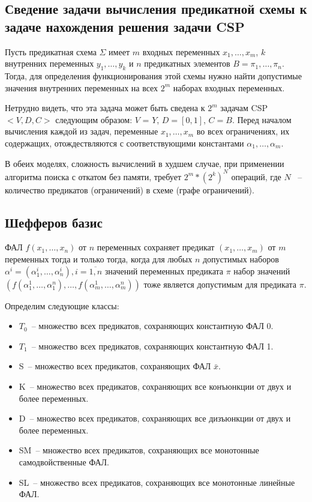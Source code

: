\documentclass[12pt]{article}
\newenvironment{definition}[1][Определение]{\begin{trivlist}
\item[\hskip \labelsep {\bfseries #1}]}{\end{trivlist}}
\begin{document}
\subsection{Сведение задачи вычисления предикатной схемы к задаче нахождения решения задачи CSP}

Пусть предикатная схема $\Sigma$ имеет $m$ входных переменных $x_1, \ldots , x_m$, 
$k$ внутренних переменных $y_1, \ldots , y_k$ и $n$ предикатных элементов $B = \pi_1, \dots , \pi_n$. 
Тогда, для определения функционирования этой схемы нужно найти допустимые значения внутренних переменных на всех $2^{m}$
наборах входных переменных. 

Нетрудно видеть, что эта задача может быть сведена к $2^m$ задачам CSP $<V, D, C>$ следующим образом:
$V$ = $Y$, $D = [0, 1]$, $C = B$. Перед началом вычисления каждой из задач, переменные $x_1, \ldots , x_m$ 
во всех ограничениях, их содержащих, отождествляются с соответствующими константами $\alpha_1, \ldots , \alpha_m$.

В обеих моделях, сложность вычислений в худшем случае, при применении алгоритма поиска 
с откатом без памяти, требует $2^m * (2^k)^N$ операций, где $N$ ~-- количество предикатов (ограничений) 
в схеме (графе ограничений).

\subsection{Шефферов базис}

\begin{definition} ФАЛ
$f (x_1, \ldots, x_n)$ от $n$ переменных сохраняет предикат $ (x_1, \ldots, x_m)$ от $m$
переменных тогда и только тогда, когда для любых $n$ допустимых наборов $\alpha^i = (\alpha_1^i, \ldots, \alpha_n^i), 
i = \overline{1, n}$ значений переменных предиката $\pi$ набор
значений $( f(\alpha_1^1, \ldots, \alpha_1^n), \ldots, f(\alpha_m^1, \ldots, \alpha_m^n) )$
тоже является допустимым для предиката $\pi$.
\end{definition}

Определим следующие классы:
\begin{itemize}
    \item{$T_0$}~-- множество всех предикатов, сохраняющих константную ФАЛ 0.
    \item{$T_1$}~-- множество всех предикатов, сохраняющих константную ФАЛ 1.
    \item{S}~-- множество всех предикатов, сохраняющих ФАЛ $\bar{x}$.
    \item{K}~-- множество всех предикатов, сохраняющих все конъюнкции от двух и более переменных.
    \item{D}~-- множество всех предикатов, сохраняющих все дизъюнкции от двух и более переменных.
    \item{SM}~-- множество всех предикатов, сохраняющих все монотонные самодвойственные ФАЛ.
    \item{SL}~-- множество всех предикатов, сохраняющих все монотонные линейные ФАЛ.
\end{itemize}
\end{document}
